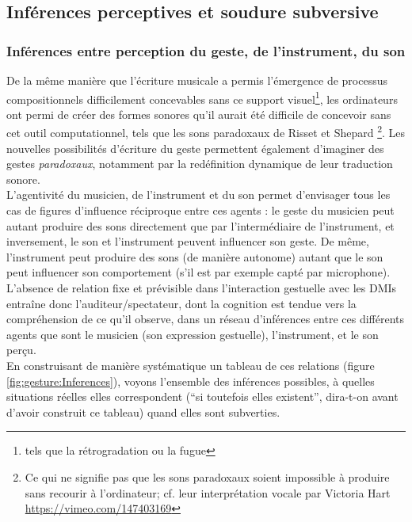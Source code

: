 \subsection{Inférences perceptives et soudure subversive}
\label{sec:gesture:inferences-soudure}

\subsubsection{Inférences entre perception du geste, de l'instrument, du son}
\label{sec:gesture:inferences-soudure:inferences}

\noindent De la même manière que l'écriture musicale a permis l'émergence de processus compositionnels difficilement concevables sans ce support visuel\footnote{tels que la rétrogradation ou la fugue}, les ordinateurs ont permi de créer des formes sonores qu'il aurait été difficile de concevoir sans cet outil computationnel, tels que les sons paradoxaux de Risset et Shepard \footnote{Ce qui ne signifie pas que les sons paradoxaux soient impossible à produire sans recourir à l'ordinateur; cf. leur interprétation vocale par Victoria Hart \url{https://vimeo.com/147403169}}. Les nouvelles possibilités d'écriture du geste permettent également d'imaginer des gestes \textit{paradoxaux}, notamment par la redéfinition dynamique de leur traduction sonore.\\
\indent L'agentivité du musicien, de l'instrument et du son permet d'envisager tous les cas de figures d'influence réciproque entre ces agents : le geste du musicien peut autant produire des sons directement que par l'intermédiaire de l'instrument, et inversement, le son et l'instrument peuvent influencer son geste. De même, l'instrument peut produire des sons (de manière autonome) autant que le son peut influencer son comportement (s'il est par exemple capté par microphone). L'absence de relation fixe et prévisible dans l'interaction gestuelle avec les \glspl{DMI} entraîne donc l'auditeur/spectateur, dont la cognition est tendue vers la compréhension de ce qu'il observe, dans un réseau d'inférences entre ces différents agents que sont le musicien (son expression gestuelle), l'instrument, et le son perçu.\\
\indent En construisant de manière systématique un tableau de ces relations (figure \ref{fig:gesture:Inferences}), voyons l'ensemble des inférences possibles, à quelles situations réelles elles correspondent (``si toutefois elles existent'', dira-t-on avant d'avoir construit ce tableau) quand elles sont subverties.
